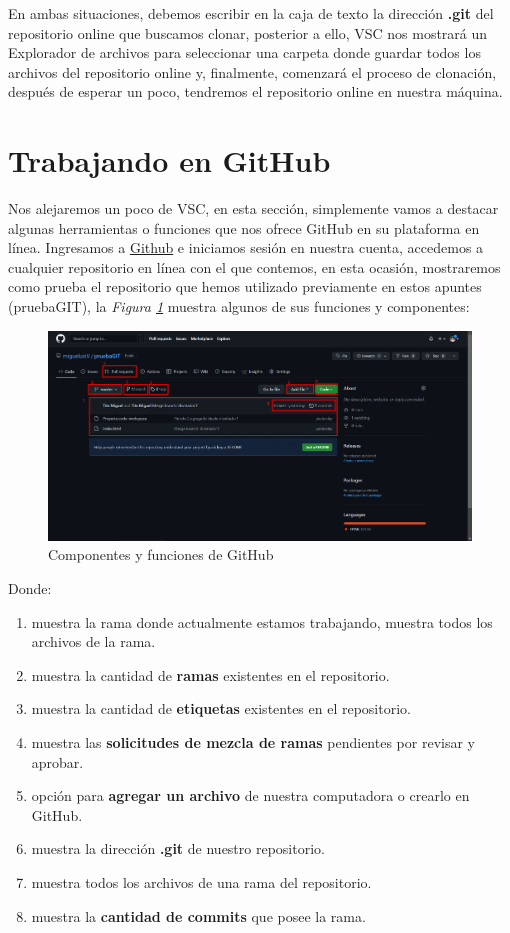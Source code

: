 En ambas situaciones, debemos escribir en la caja de texto la dirección \textbf{.git} del repositorio online que buscamos clonar, posterior a ello, VSC nos mostrará un Explorador de archivos para seleccionar una carpeta donde guardar todos los archivos del repositorio online y, finalmente, comenzará el proceso de clonación, después de esperar un poco, tendremos el repositorio online en nuestra máquina.



\section{Trabajando en GitHub}
\hspace{0.55cm}Nos alejaremos un poco de VSC, en esta sección, simplemente vamos a destacar algunas herramientas o funciones que nos ofrece GitHub en su plataforma en línea. Ingresamos a \href{https://github.com/}{Github} e iniciamos sesión en nuestra cuenta, accedemos a cualquier repositorio en línea con el que contemos, en esta ocasión, mostraremos como prueba el repositorio que hemos utilizado previamente en estos apuntes (pruebaGIT), la \textit{Figura \ref{fig: 34}} muestra algunos de sus funciones y componentes:
\begin{figure}[H]
    \centering
    \caption{Componentes y funciones de GitHub}
    \label{fig: 34}
    \includegraphics[width=\textwidth]{capturas/github.png}
\end{figure}

Donde:
\begin{enumerate}
    \item muestra la rama donde actualmente estamos trabajando, muestra todos los archivos de la rama.
    \item muestra la cantidad de \textbf{ramas} existentes en el repositorio.
    \item muestra la cantidad de \textbf{etiquetas} existentes en el repositorio.
    \item muestra las \textbf{solicitudes de mezcla de ramas} pendientes por revisar y aprobar.
    \item opción para \textbf{agregar un archivo} de nuestra computadora o crearlo en GitHub.
    \item muestra la dirección \textbf{.git} de nuestro repositorio.
    \item muestra todos los archivos de una rama del repositorio.
    \item muestra la \textbf{cantidad de commits} que posee la rama.
\end{enumerate}



